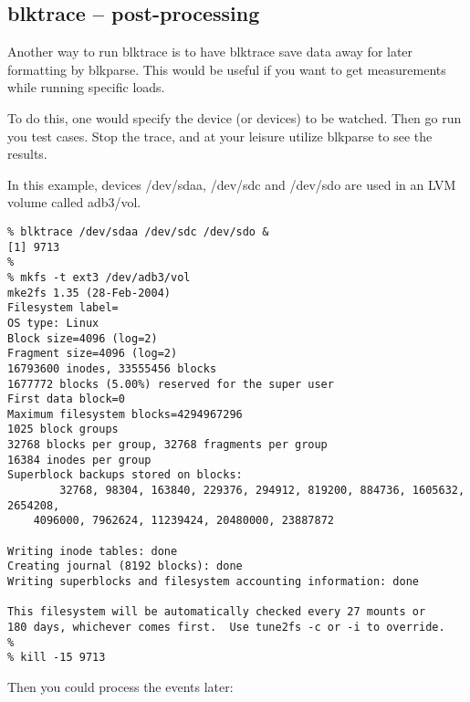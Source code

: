\documentclass{article}
\begin{document}
\subsection{\label{sec:blktrace-post}blktrace -- post-processing}

Another way to run blktrace is to have blktrace save data away for later
formatting by blkparse. This would be useful if you want to get 
measurements while running specific loads.

To do this, one would specify the device (or devices) to be watched. Then 
go run you test cases. Stop the trace, and at your leisure utilize
blkparse to see the results.

In this example, devices /dev/sdaa, /dev/sdc and /dev/sdo are used in an 
LVM volume called adb3/vol.

\begin{verbatim}
% blktrace /dev/sdaa /dev/sdc /dev/sdo &
[1] 9713
%
% mkfs -t ext3 /dev/adb3/vol
mke2fs 1.35 (28-Feb-2004)
Filesystem label=
OS type: Linux
Block size=4096 (log=2)
Fragment size=4096 (log=2)
16793600 inodes, 33555456 blocks
1677772 blocks (5.00%) reserved for the super user
First data block=0
Maximum filesystem blocks=4294967296
1025 block groups
32768 blocks per group, 32768 fragments per group
16384 inodes per group
Superblock backups stored on blocks: 
        32768, 98304, 163840, 229376, 294912, 819200, 884736, 1605632, 2654208, 
	4096000, 7962624, 11239424, 20480000, 23887872

Writing inode tables: done                            
Creating journal (8192 blocks): done
Writing superblocks and filesystem accounting information: done

This filesystem will be automatically checked every 27 mounts or
180 days, whichever comes first.  Use tune2fs -c or -i to override.
%
% kill -15 9713
\end{verbatim}

Then you could process the events later:
\end{document}
